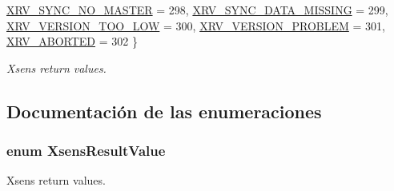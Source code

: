 \begin{DoxyCompactItemize}
\*
\hyperlink{group__enums_gga822a2260a20af524029eef9e9a51ff6fa18896a5b8edc526446eabb742bf5cd5c}{\-X\-R\-V\-\_\-\-S\-Y\-N\-C\-\_\-\-N\-O\-\_\-\-M\-A\-S\-T\-E\-R} =  298, 
\hyperlink{group__enums_gga822a2260a20af524029eef9e9a51ff6fac6a703db248440c47606cbe7c1ab9e05}{\-X\-R\-V\-\_\-\-S\-Y\-N\-C\-\_\-\-D\-A\-T\-A\-\_\-\-M\-I\-S\-S\-I\-N\-G} =  299, 
\hyperlink{group__enums_gga822a2260a20af524029eef9e9a51ff6fa5b8d087db95259213ddfd4373acd5e8a}{\-X\-R\-V\-\_\-\-V\-E\-R\-S\-I\-O\-N\-\_\-\-T\-O\-O\-\_\-\-L\-O\-W} =  300, 
\hyperlink{group__enums_gga822a2260a20af524029eef9e9a51ff6fa23fe81f77b6805658e99ee47033edd95}{\-X\-R\-V\-\_\-\-V\-E\-R\-S\-I\-O\-N\-\_\-\-P\-R\-O\-B\-L\-E\-M} =  301, 
\*
\hyperlink{group__enums_gga822a2260a20af524029eef9e9a51ff6fae4feba3dec107a09485db51627436c7d}{\-X\-R\-V\-\_\-\-A\-B\-O\-R\-T\-E\-D} =  302
 \}
\begin{DoxyCompactList}\small\item\em \-Xsens return values. \end{DoxyCompactList}\end{DoxyCompactItemize}


\subsection{\-Documentación de las enumeraciones}
\hypertarget{group__enums_ga822a2260a20af524029eef9e9a51ff6f}{
\subsubsection[{\-Xsens\-Result\-Value}]{\setlength{\rightskip}{0pt plus 5cm}enum {\bf \-Xsens\-Result\-Value}}}\label{group__enums_ga822a2260a20af524029eef9e9a51ff6f}


\-Xsens return values. 

